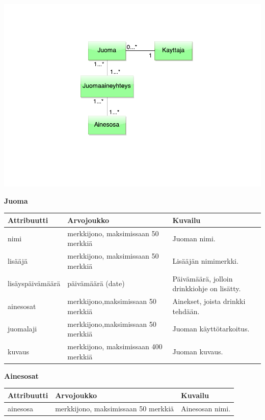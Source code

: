 \documentclass[a4paper]{article}
\begin{document}
\includegraphics[scale=0.8]{kasitekaavio.pdf}

\begin{flushleft}\textbf{Juoma} \end{flushleft}
\begin{flushleft}
	\begin{tabular}{|l|l|l|}\hline
			Attribuutti      & Arvojoukko        & Kuvailu\\
			\hline
			nimi & merkkijono, maksimissaan 50 merkkiä & Juoman nimi.\\ 
			\hline
			lisääjä & merkkijono, maksimissaan 50 merkkiä & Lisääjän nimimerkki.\\ 
			\hline
			lisäyspäivämäärä & päivämäärä (date) & Päivämäärä, jolloin drinkkiohje on lisätty.\\ 
			\hline
			ainesosat  & merkkijono,maksimissaan 50 merkkiä & Ainekset, joista drinkki tehdään. \\
			\hline
			juomalaji    & merkkijono,maksimissaan 50 merkkiä  & Juoman käyttötarkoitus. \\ 
			\hline
			kuvaus    & merkkijono, maksimissaan 400 merkkiä & Juoman kuvaus. \\ 
				\hline
	\end{tabular}
\end{flushleft}

\begin{flushleft}\textbf{Ainesosat} \end{flushleft}
\begin{flushleft}
	\begin{tabular}{|l|l|l|}
			\hline
			Attribuutti & Arvojoukko & Kuvailu \\ 
			\hline
			ainesosa & merkkijono, maksimissaan 50 merkkiä & Ainesosan nimi. \\ 
			\hline
	\end{tabular}
\end{flushleft}
\end{document}
